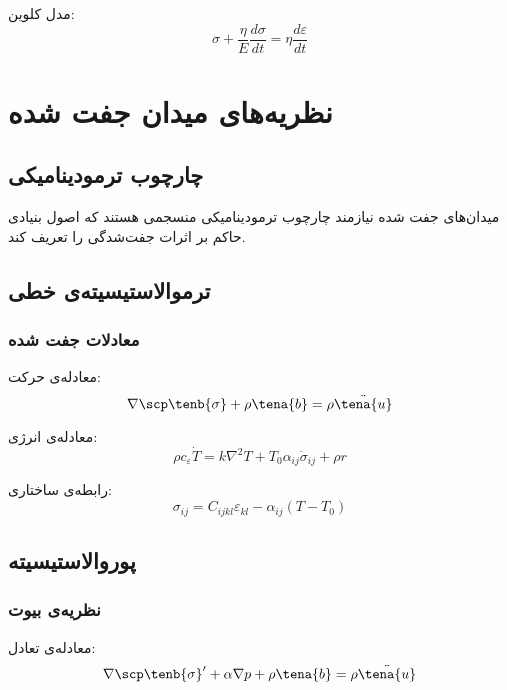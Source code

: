 مدل کلوین:
\begin{equation}
	\sigma + \frac{\eta}{E} \frac{d\sigma}{dt} = \eta \frac{d\varepsilon}{dt}
\end{equation}

\section{نظریه‌های میدان جفت شده}

\subsection{چارچوب ترمودینامیکی}

میدان‌های جفت شده نیازمند چارچوب ترمودینامیکی منسجمی هستند که اصول بنیادی حاکم بر اثرات جفت‌شدگی را تعریف کند.

\subsection{ترموالاستیسیته‌ی خطی}

\subsubsection{معادلات جفت شده}
معادله‌ی حرکت:
\begin{equation}
	\nabla \scp \tenb{\sigma} + \rho \tena{b} = \rho \ddot{\tena{u}}
\end{equation}

معادله‌ی انرژی:
\begin{equation}
	\rho c_\varepsilon \dot{T} = k \nabla^2 T + T_0 \alpha_{ij} \dot{\sigma}_{ij} + \rho r
\end{equation}

رابطه‌ی ساختاری:
\begin{equation}
	\sigma_{ij} = C_{ijkl} \varepsilon_{kl} - \alpha_{ij} (T - T_0)
\end{equation}

\subsection{پوروالاستیسیته}

\subsubsection{نظریه‌ی بیوت}
معادله‌ی تعادل:
\begin{equation}
	\nabla \scp \tenb{\sigma}' + \alpha \nabla p + \rho \tena{b} = \rho \ddot{\tena{u}}
\end{equation}

